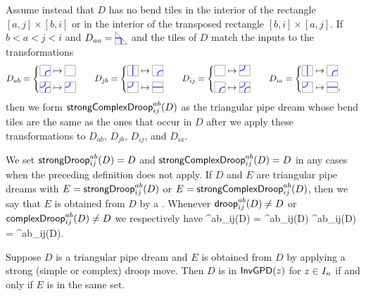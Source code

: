 \documentclass[10pt]{article}
\begin{document}
\begin{definition}
\item[(b)] 
Assume instead
that $D$ has no bend tiles in the interior of the
rectangle $[a,j]\times[b,i]$
or in the interior of the transposed rectangle  $[b,i]\times [a,j]$.
If $b<a<j<i$ and $D_{aa}=\PDIAG$ and the
 tiles of $D$ 
 match the inputs to the transformations
\[
\ba
D_{ab} &= \begin{cases}
\CTILE \mapsto \BTILE \\[-10pt]\\
\ETILE \mapsto \JTILE  
\end{cases}
&
D_{jb} &=\begin{cases}
\VTILE \mapsto \CTILE \\[-10pt]\\
\JTILE  \mapsto \HTILE
\end{cases}
&
D_{ij} &= \begin{cases}
\BTILE \mapsto \JTILE \\[-10pt]\\
\CTILE  \mapsto \ETILE  
\end{cases}
&
D_{ia} &= \begin{cases}
\VTILE \mapsto \CTILE \\[-10pt]\\
\JTILE  \mapsto \HTILE,
\end{cases}
\ea
\]
then we form $\mathsf{strongComplexDroop}^{ab}_{ij}(D)$
as the triangular pipe dream whose bend tiles are the same as the ones 
that occur in $D$ after we apply these transformations to $D_{ab}$, $D_{jb}$, $D_{ij}$, 
and $D_{ia}$.


\een
\end{definition}


We set $\mathsf{strongDroop}^{ab}_{ij}(D)=D$
and  $\mathsf{strongComplexDroop}^{ab}_{ij}(D)=D$
in any cases when the preceding definition does not apply.
If $D$ and $E$ are triangular pipe dreams
with $E =\mathsf{strongDroop}^{ab}_{ij}(D)$ or
$E =  \mathsf{strongComplexDroop}^{ab}_{ij}(D)$, then
we say that $E$ is obtained from $D$ by
a .
Whenever $\mathsf{droop}^{ab}_{ij}(D) \neq D$ or  
 $\mathsf{complexDroop}^{ab}_{ij}(D) \neq D$
 we respectively have 
 \be\droop^{ab}_{ij}(D) = \extDroop^{ab}_{ij}(D)
\quand
\complexDroop^{ab}_{ij}(D) = \extComplexDroop^{ab}_{ij}(D).
 \ee



\begin{proposition}\label{droops-preserve-prop}
Suppose $D$ is a triangular pipe dream and $E$ is obtained 
from $D$ by applying a strong (simple or complex) droop move.
Then $D$ is in $\mathsf{InvGPD}(z)$
for $z \in I_n$ 
if and only if $E$ is in the same set.
\end{proposition}
\end{document}
